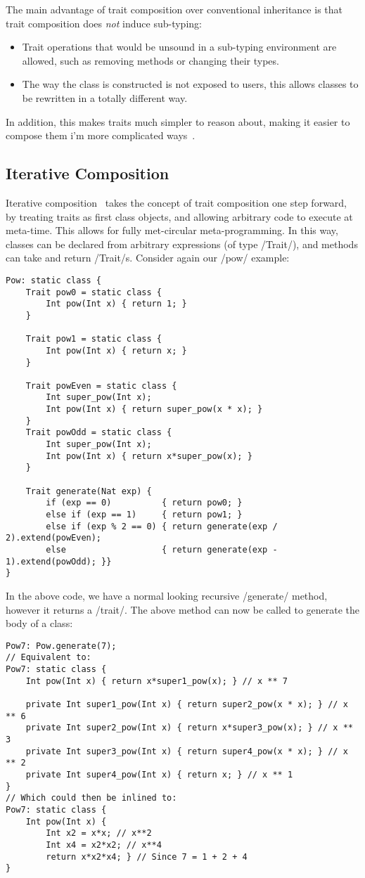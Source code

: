 The main advantage of trait composition over conventional inheritance is that trait composition does \emph{not} induce sub-typing:
\begin{itemize}
	\item Trait operations that would be unsound in a sub-typing environment are allowed, such as removing methods or changing their types.
	\item The way the class is constructed is not exposed to users, this allows classes to be rewritten in a totally different way.
\end{itemize}
In addition, this makes traits much simpler to reason about, making it easier to compose them i'm more complicated ways~\cite{?}.

\subsection{Iterative Composition}
Iterative composition~\cite{?} takes the concept of trait composition one step forward, by treating traits as first class objects, and allowing arbitrary code to execute at meta-time. This allows for fully met-circular meta-programming. In this way, classes can be declared from arbitrary expressions (of type /Trait/), and methods can take and return /Trait/s. Consider again our /pow/ example:
\begin{lstlisting}
Pow: static class {
	Trait pow0 = static class {
		Int pow(Int x) { return 1; }
	}

	Trait pow1 = static class {
		Int pow(Int x) { return x; }
	}

	Trait powEven = static class {
		Int super_pow(Int x);
		Int pow(Int x) { return super_pow(x * x); }
	}
	Trait powOdd = static class {
		Int super_pow(Int x);
		Int pow(Int x) { return x*super_pow(x); }
	}

	Trait generate(Nat exp) {
		if (exp == 0)          { return pow0; }
		else if (exp == 1)     { return pow1; }
		else if (exp % 2 == 0) { return generate(exp / 2).extend(powEven);
		else                   { return generate(exp - 1).extend(powOdd); }}
}
\end{lstlisting}

In the above code, we have a normal looking recursive /generate/ method, however it returns a /trait/. The above method can now be called to generate the body of a class:

\begin{lstlisting}
Pow7: Pow.generate(7);
// Equivalent to:
Pow7: static class {
	Int pow(Int x) { return x*super1_pow(x); } // x ** 7

	private Int super1_pow(Int x) { return super2_pow(x * x); } // x ** 6
	private Int super2_pow(Int x) { return x*super3_pow(x); } // x ** 3
	private Int super3_pow(Int x) { return super4_pow(x * x); } // x ** 2
	private Int super4_pow(Int x) { return x; } // x ** 1
}
// Which could then be inlined to:
Pow7: static class {
	Int pow(Int x) { 
		Int x2 = x*x; // x**2
		Int x4 = x2*x2; // x**4
		return x*x2*x4; } // Since 7 = 1 + 2 + 4
}
\end{lstlisting}